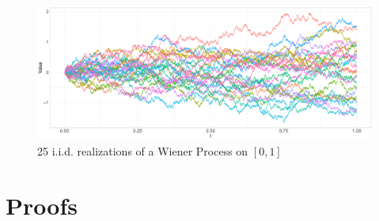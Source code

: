 \documentclass[11pt,twoside,a4paper]{article}
\begin{document}
\begin{figure}[H]\label{Wiener_plot}
	\includegraphics[width = \textwidth]{../Graphics/Wiener_plot.pdf}
	\caption{25 i.i.d. realizations of a Wiener Process on $[0,1]$}
\end{figure}

	\section{Proofs}
\end{document}
